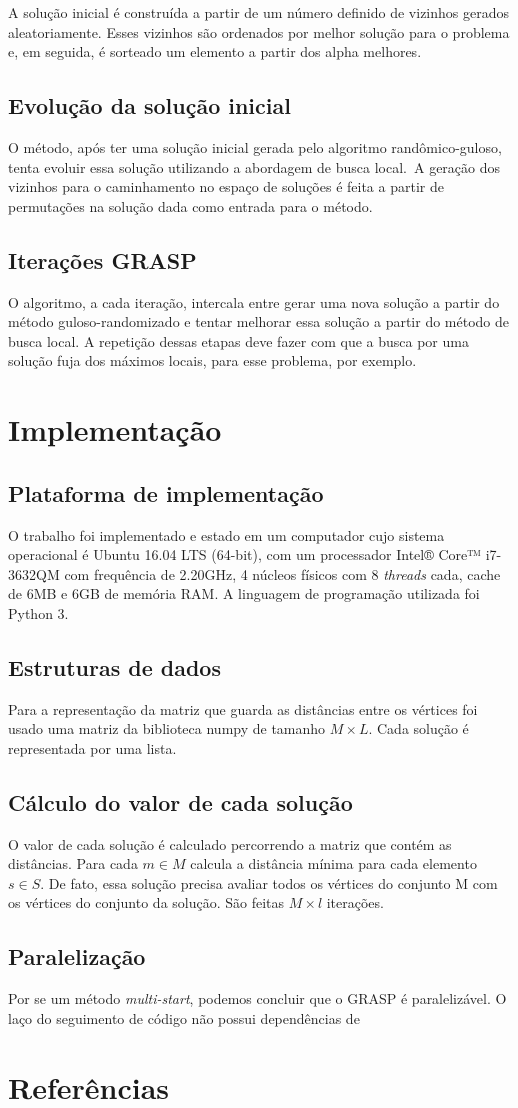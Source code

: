 \documentclass[12pt]{article}
\begin{document}
A solução inicial é construída a partir de um número definido de vizinhos gerados aleatoriamente. Esses vizinhos são ordenados por melhor solução para o problema e, em seguida, é sorteado um elemento a partir dos alpha melhores.

\subsection{Evolução da solução inicial} O método, após ter uma solução inicial gerada pelo algoritmo randômico-guloso, tenta evoluir essa solução utilizando a abordagem de busca local. A geração dos vizinhos para o caminhamento no espaço de soluções é feita a partir de permutações na solução dada como entrada para o método.

\subsection{Iterações GRASP} O algoritmo, a cada iteração, intercala entre gerar uma nova solução a partir do método guloso-randomizado e tentar melhorar essa solução a partir do método de busca local. A repetição dessas etapas deve fazer com que a busca por uma solução fuja dos máximos locais, para esse problema, por exemplo. 

\section{Implementação}
\subsection{Plataforma de implementação}
O trabalho foi implementado e estado em um computador cujo sistema operacional é Ubuntu 16.04 LTS (64-bit), com um processador Intel® Core™ i7-3632QM com frequência de 2.20GHz, 4 núcleos físicos com 8 \textit{threads} cada, cache de 6MB e 6GB de memória RAM. A linguagem de programação utilizada foi Python 3. 
\subsection{Estruturas de dados}
Para a representação da matriz que guarda as distâncias entre os vértices foi usado uma matriz da biblioteca numpy de tamanho $M \times L$. Cada solução é representada por uma lista.

\subsection{Cálculo do valor de cada solução}
O valor de cada solução é calculado percorrendo a matriz que contém as distâncias. Para cada $m \in M$ calcula a distância mínima para cada elemento $s \in S$. De fato, essa solução precisa avaliar todos os vértices do conjunto M com os vértices do conjunto da solução. São feitas $M \times l$ iterações. 

\subsection{Paralelização}
Por se um método \textit{multi-start}, podemos concluir que o GRASP é paralelizável. O laço do seguimento de código não possui dependências de 


\section{Referências}





\end{document}
